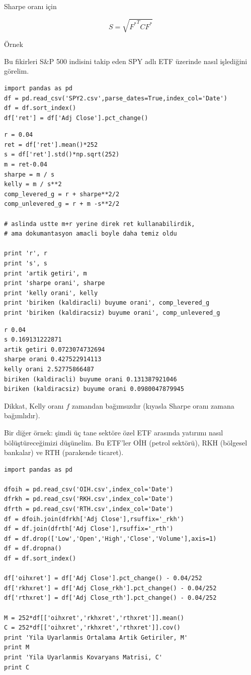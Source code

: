 \documentclass[12pt,fleqn]{article}\usepackage{../../common}
\begin{document}
Sharpe oranı için 

$$ S = \sqrt{{F^*}^TCF^*} $$

Örnek

Bu fikirleri S\&P 500 indisini takip eden SPY adlı ETF üzerinde nasıl
işlediğini görelim. 

\begin{verbatim}
import pandas as pd
df = pd.read_csv('SPY2.csv',parse_dates=True,index_col='Date')
df = df.sort_index()
df['ret'] = df['Adj Close'].pct_change()
\end{verbatim}

\begin{verbatim}
r = 0.04
ret = df['ret'].mean()*252
s = df['ret'].std()*np.sqrt(252)
m = ret-0.04
sharpe = m / s
kelly = m / s**2
comp_levered_g = r + sharpe**2/2
comp_unlevered_g = r + m -s**2/2

# aslinda ustte m+r yerine direk ret kullanabilirdik, 
# ama dokumantasyon amacli boyle daha temiz oldu

print 'r', r
print 's', s
print 'artik getiri', m
print 'sharpe orani', sharpe
print 'kelly orani', kelly
print 'biriken (kaldiracli) buyume orani', comp_levered_g
print 'biriken (kaldiracsiz) buyume orani', comp_unlevered_g
\end{verbatim}

\begin{verbatim}
r 0.04
s 0.169131222871
artik getiri 0.0723074732694
sharpe orani 0.427522914113
kelly orani 2.52775866487
biriken (kaldiracli) buyume orani 0.131387921046
biriken (kaldiracsiz) buyume orani 0.0980047879945
\end{verbatim}

Dikkat, Kelly oranı $f$ zamandan bağımsızdır (kıyasla Sharpe oranı zamana
bağımlıdır). 

Bir diğer örnek: şimdi üç tane sektöre özel ETF arasında yatırımı nasıl
bölüştüreceğimizi düşünelim. Bu ETF'ler OİH (petrol sektörü), RKH (bölgesel
bankalar) ve RTH (parakende ticaret). 

\begin{verbatim}
import pandas as pd

dfoih = pd.read_csv('OIH.csv',index_col='Date')
dfrkh = pd.read_csv('RKH.csv',index_col='Date')
dfrth = pd.read_csv('RTH.csv',index_col='Date')
df = dfoih.join(dfrkh['Adj Close'],rsuffix='_rkh')
df = df.join(dfrth['Adj Close'],rsuffix='_rth')
df = df.drop(['Low','Open','High','Close','Volume'],axis=1)
df = df.dropna()
df = df.sort_index()

df['oihxret'] = df['Adj Close'].pct_change() - 0.04/252
df['rkhxret'] = df['Adj Close_rkh'].pct_change() - 0.04/252
df['rthxret'] = df['Adj Close_rth'].pct_change() - 0.04/252

M = 252*df[['oihxret','rkhxret','rthxret']].mean()
C = 252*df[['oihxret','rkhxret','rthxret']].cov()
print 'Yila Uyarlanmis Ortalama Artik Getiriler, M'
print M
print 'Yila Uyarlanmis Kovaryans Matrisi, C'
print C
\end{verbatim}
\end{document}
